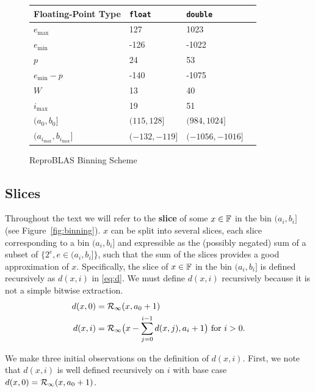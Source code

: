     \begin{figure}[H]
        \centering
        \begin{tabular}{ | l | l | l | p{5cm} |} \hline
            Floating-Point Type & \texttt{float} & \texttt{double}\\ \hline
            $e_{\max}$ & 127 & 1023\\ \hline
            $e_{\min}$ &  -126 & -1022 \\ \hline
            $p$ & 24 & 53 \\ \hline
            $e_{\min} - p$ & -140 & -1075 \\ \hline
            $W$ & 13 & 40 \\ \hline
            $i_{\max}$ & 19 & 51 \\ \hline
            $(a_0, b_0]$ & $(115, 128]$ & $(984, 1024]$\\ \hline
            $(a_{i_{\max}}, b_{i_{\max}}]$ & $(-132, -119]$ & $(-1056, -1016]$ \\ \hline
        \end{tabular}
        \caption{ReproBLAS Binning Scheme}
        \label{fig:bins}
    \end{figure}

    \subsection{Slices}
    \label{sec:binning_slices}
    Throughout the text we will refer to the \textbf{slice} of some $x \in \mathbb{F}$
    in the bin $(a_i, b_i]$ (see Figure~\ref{fig:binning}).
    $x$ can be split into several slices, each slice
    corresponding to a bin $(a_i, b_i]$ and expressible as the (possibly
    negated) sum of a subset of $\{2^e, e \in (a_i, b_i]\}$, such that the sum
    of the slices provides a good approximation of $x$. Specifically, the slice
    of $x \in \mathbb{F}$ in the bin $(a_i, b_i]$ is defined recursively as $d(x, i)$
    in \eqref{eq:d}. We must define $d(x, i)$ recursively because it is not a
    simple bitwise extraction.
    \begin{equation}
      \begin{aligned}
      d(x,0) & = \mathcal{R}_\text{$\infty$}(x, a_0+1) \\
      d(x, i) & = \mathcal{R}_\text{$\infty$}\bigl(x - \sum\limits_{j=0}^{i - 1}d(x,j), a_i + 1\bigr)
        \text{ for } i > 0.
      \end{aligned}
      \label{eq:d}
    \end{equation}

    We make three initial observations on the definition of $d(x, i)$. First,
    we note that $d(x, i)$ is well defined recursively on $i$ with base case
    $d(x, 0) = \mathcal{R}_\text{$\infty$}(x, a_0 + 1)$.

